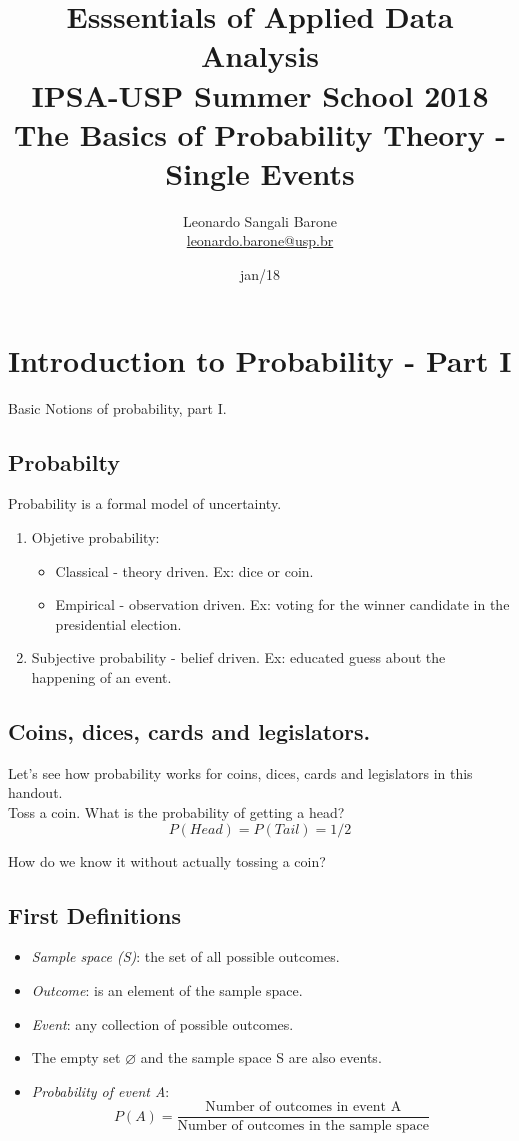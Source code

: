 \documentclass[11pt]{article}
\title{\textbf{Esssentials of Applied Data Analysis\\
				IPSA-USP Summer School 2018}\newline\\
				The Basics of Probability Theory - Single Events}
\author{Leonardo Sangali Barone\\ \href{leonardo.barone@usp.br}{leonardo.barone@usp.br}}
\date{jan/18}
\let\emptyset\varnothing
\begin{document}
\maketitle

\section*{Introduction to Probability - Part I}

	Basic Notions of probability, part I.
	
	\subsection*{Probabilty}
	Probability is a formal model of uncertainty.

	\begin{enumerate}
	\item Objetive probability:
		\begin{itemize}
			\item Classical - theory driven. Ex: dice or coin.
			\item Empirical - observation driven. Ex: voting for the winner candidate in the presidential election.
		\end{itemize}
	\item Subjective probability - belief driven. Ex: educated guess about the happening of an event.
	\end{enumerate}

	\subsection*{Coins, dices, cards and legislators.}
	
	Let's see how probability works for coins, dices, cards and legislators in this handout.\\
	
 	Toss a coin. What is the probability of getting a head?
	\[P(Head) = P(Tail) = 1/2	\]
	
	How do we know it without actually tossing a coin?

	\subsection*{First Definitions}
	\begin{itemize}
		\item \emph{Sample space (S)}: the set of all possible outcomes.
		\item \emph{Outcome}: is an element of the sample space.
		\item \emph{Event}: any collection of possible outcomes.
		\item The empty set $\emptyset$ and the sample space S are also events.	
		\item \emph{Probability of event A}:
			\[P(A) = \frac{\text{Number of outcomes in event A}}
			{\text{Number of outcomes in the sample space}}\]		
	\end {itemize}
\end{document}
